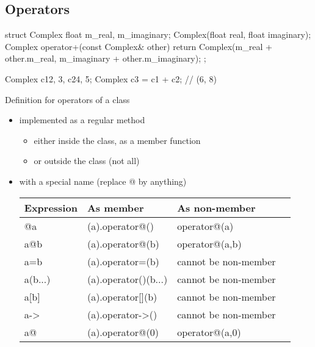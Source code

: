 \subsection[Op]{Operators}

\begin{frame}[fragile]
  \begin{cppcode}
    struct Complex {
      float m_real, m_imaginary;
      Complex(float real, float imaginary);
      Complex operator+(const Complex& other) {
        return Complex(m_real + other.m_real,
                       m_imaginary + other.m_imaginary);
      }
    };

    Complex c1{2, 3}, c2{4, 5};
    Complex c3 = c1 + c2; // (6, 8)
  \end{cppcode}
\end{frame}

\begin{frame}
  \begin{block}{Definition for operators of a class}
    \begin{itemize}
    \item implemented as a regular method
      \begin{itemize}
      \item either inside the class, as a member function
      \item or outside the class (not all)
      \end{itemize}
    \item with a special name (replace @ by anything)
      \begin{tabular}{llll}
        Expression & As member & As non-member \\
        \hline
        @a & (a).operator@() & operator@(a) \\
        a@b & (a).operator@(b) & operator@(a,b) \\
        a=b & (a).operator=(b) & cannot be non-member \\
        a(b...) & (a).operator()(b...) & cannot be non-member \\
        a[b] & (a).operator[](b) & cannot be non-member \\
        a-\textgreater & (a).operator-\textgreater() & cannot be non-member \\
        a@ & (a).operator@(0) & operator@(a,0) \\
      \end{tabular}
    \end{itemize}
  \end{block}
\end{frame}

